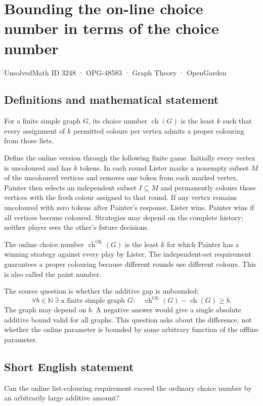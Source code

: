 \documentclass[11pt,a4paper]{article}
\begin{document}
\section*{Bounding the on-line choice number in terms of the choice number}\label{3248}
{\small UnsolvedMath ID 3248 · OPG-48583 · Graph Theory · OpenGarden}
\subsection{Definitions and mathematical statement}
For a finite simple graph $G$, its choice number $\operatorname{ch}(G)$ is
the least $k$ such that every assignment of $k$ permitted colours per
vertex admits a proper colouring from those lists.

Define the online version through the following finite game. Initially
every vertex is uncoloured and has $k$ tokens. In each round Lister marks
a nonempty subset $M$ of the uncoloured vertices and removes one token
from each marked vertex. Painter then selects an independent subset
$I\subseteq M$ and permanently colours those vertices with the fresh
colour assigned to that round. If any vertex remains uncoloured with
zero tokens after Painter's response, Lister wins. Painter wins if all
vertices become coloured. Strategies may depend on the complete history;
neither player sees the other's future decisions.

The online choice number $\operatorname{ch}^{\mathrm{OL}}(G)$ is the least
$k$ for which Painter has a winning strategy against every play by Lister.
The independent-set requirement guarantees a proper colouring because
different rounds use different colours. This is also called the paint
number.

The source question is whether the additive gap is unbounded:
\[
 \forall b\in\mathbb N\ \exists\text{ a finite simple graph }G:
 \quad\operatorname{ch}^{\mathrm{OL}}(G)-\operatorname{ch}(G)\ge b.
\]
The graph may depend on $b$. A negative answer would give a single
absolute additive bound valid for all graphs. This question asks about
the difference, not whether the online parameter is bounded by some
arbitrary function of the offline parameter.
\subsection{Short English statement}
Can the online list-colouring requirement exceed the ordinary choice number by an arbitrarily large additive amount?
\end{document}
